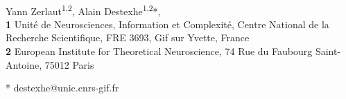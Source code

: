 \documentclass[10pt,letterpaper]{article}
\date{}
\begin{document}
\vspace*{0.2in}

\begin{flushleft}
{\Large
\textbf{} 
}
\newline
\\
Yann Zerlaut\textsuperscript{1,2},
Alain Destexhe\textsuperscript{1,2}*,
\\
\bigskip
\textbf{1} Unité de Neurosciences, Information et Complexité, Centre National de la Recherche Scientifique, FRE 3693, Gif sur Yvette, France
\\
\textbf{2} European Institute for Theoretical Neuroscience, 74 Rue du Faubourg Saint-Antoine, 75012 Paris
\\
\bigskip

* destexhe@unic.cnrs-gif.fr

\end{flushleft}
\end{document}
